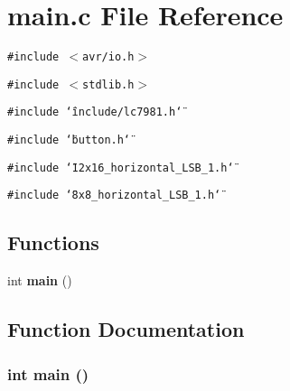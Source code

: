 \section{main.c File Reference}
\label{main_8c}
{\tt \#include $<$avr/io.h$>$}\par
{\tt \#include $<$stdlib.h$>$}\par
{\tt \#include \char`\"{}include/lc7981.h\char`\"{}}\par
{\tt \#include \char`\"{}button.h\char`\"{}}\par
{\tt \#include \char`\"{}12x16\_\-horizontal\_\-LSB\_\-1.h\char`\"{}}\par
{\tt \#include \char`\"{}8x8\_\-horizontal\_\-LSB\_\-1.h\char`\"{}}\par
\subsection*{Functions}
\begin{CompactItemize}
\item 
int {\bf main} ()
\end{CompactItemize}


\subsection{Function Documentation}
\subsubsection{\setlength{\rightskip}{0pt plus 5cm}int main ()}\label{main_8c_e66f6b31b5ad750f1fe042a706a4e3d4}


